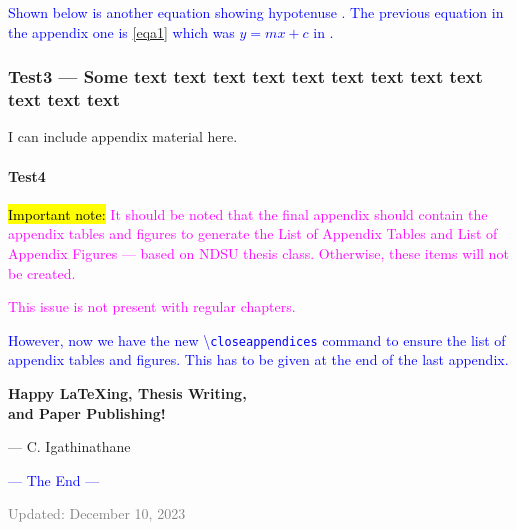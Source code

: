 \documentclass[phd,showgrids]{ndsu-thesis-2022}
\newcommand\italk[1]{\textcolor{blue}{#1}}  %
\newcommand\cmd[1]{\textbackslash\texttt{#1}}  %
\begin{document}
\italk{Shown below is another equation showing hypotenuse \Cref{eqc1}. The previous equation in the appendix one is \cref{eqa1} which was $y = mx + c$ in \cpageref{eqa1}. } 
 

\subsubsection{Test3 --- Some text text text text text text text text text text text text}
I can include appendix material here. 

\paragraph{Test4}

{\hl{Important note:}
\textcolor{magenta}{It should be noted that the final appendix should contain the appendix tables and figures to generate the List of Appendix Tables and List of Appendix Figures --- based on NDSU thesis class. Otherwise, these items will not be created.}
} 

\textcolor{magenta}{This issue is not present with regular chapters.}

\italk{However, now we have the new \cmd{closeappendices} command to ensure the list of appendix tables and figures. This has to be given at the end of the last appendix.}

\vspace{1cm}
\begin{center}
{\LARGE\bfseries
Happy {\LaTeX}ing, Thesis Writing, \\
and Paper Publishing!
}
\end{center}

\hfill {\footnotesize --- C. Igathinathane}

\vspace{0.1in}
\begin{center}
\italk{--- The End ---}
\end{center}

\vfill
{\noindent\scriptsize\textcolor{gray}{Updated: December 10, 2023}}

\closeappendices  %
\end{document}
